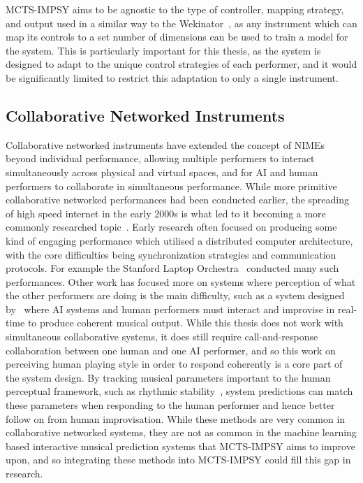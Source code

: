 MCTS-IMPSY aims to be agnostic to the type of controller, mapping strategy, and output used in a similar way to the Wekinator~\citep{Fiebrink2009Wekinator}, as any instrument which can map its controls to a set number of dimensions can be used to train a model for the system. This is particularly important for this thesis, as the system is designed to adapt to the unique control strategies of each performer, and it would be significantly limited to restrict this adaptation to only a single instrument.
 
\subsection{Collaborative Networked Instruments}
Collaborative networked instruments have extended the concept of NIMEs beyond individual performance, allowing multiple performers to interact simultaneously across physical and virtual spaces, and for AI and human performers to collaborate in simultaneous performance. While more primitive collaborative networked performances had been conducted earlier, the spreading of high speed internet in the early 2000s is what led to it becoming a more commonly researched topic~\citep{Renaud2007NetworkedMusic}. Early research often focused on producing some kind of engaging performance which utilised a distributed computer architecture, with the core difficulties being synchronization strategies and communication protocols. For example the Stanford Laptop Orchestra~\citep{Wang2009Slork} conducted many such performances. Other work has focused more on systems where perception of what the other performers are doing is the main difficulty, such as a system designed by~\cite{Weinberg2018MultiHumanRobot} where AI systems and human performers must interact and improvise in real-time to produce coherent musical output. While this thesis does not work with simultaneous collaborative systems, it does still require call-and-response collaboration between one human and one AI performer, and so this work on perceiving human playing style in order to respond coherently is a core part of the system design. By tracking musical parameters important to the human perceptual framework, such as rhythmic stability~\citep{Desain2002RhythmicStability}, system predictions can match these parameters when responding to the human performer and hence better follow on from human improvisation. While these methods are very common in collaborative networked systems, they are not as common in the machine learning based interactive musical prediction systems that MCTS-IMPSY aims to improve upon, and so integrating these methods into MCTS-IMPSY could fill this gap in research.

